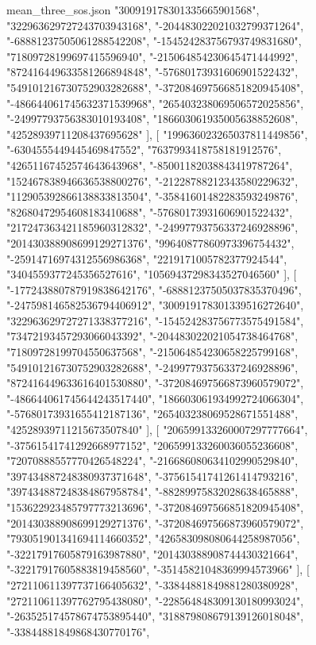 \begin{filecontents*}[overwrite]{mean_three_sos.json}
    "300919178301335665901568",
    "322963629727243703943168",
    "-204483022021032799371264",
    "-68881237505061288542208",
    "-154524283756793749831680",
    "71809728199697415596940",
    "-215064854230645471444992",
    "872416449633581266894848",
    "-57680173931606901522432",
    "549101216730752903282688",
    "-372084697566851820945408",
    "-486644061745632371539968",
    "265403238069506572025856",
    "-24997793756383010193408",
    "186603061935005638852608",
    "42528939711208437695628"
   ],
   [
    "199636023265037811449856",
    "-6304555449445469847552",
    "7637993418758181912576",
    "42651167452574643643968",
    "-85001182038843419787264",
    "152467838946636538800276",
    "-21228788212343580229632",
    "112905392866138833813504",
    "-35841601482283593249876",
    "82680472954608183410688",
    "-57680173931606901522432",
    "217247363421185960312832",
    "-24997793756337246928896",
    "201430388908699129271376",
    "99640877860973396754432",
    "-25914716974312556986368",
    "2219171005782377924544",
    "3404559377245356527616",
    "10569437298343527046560"
   ],
   [
    "-177243880787919838642176",
    "-68881237505037835370496",
    "-247598146582536794406912",
    "300919178301339516272640",
    "322963629727271338377216",
    "-154524283756773575491584",
    "73472193457293066043392",
    "-204483022021054738464768",
    "71809728199704550637568",
    "-215064854230658225799168",
    "549101216730752903282688",
    "-24997793756337246928896",
    "872416449633616401530880",
    "-372084697566873960579072",
    "-486644061745644243517440",
    "186603061934992724066304",
    "-57680173931655412187136",
    "265403238069528671551488",
    "42528939711215673507840"
   ],
   [
    "206599133260007297777664",
    "-37561541741292668977152",
    "206599133260036055236608",
    "72070888557770426548224",
    "-216686080634102990529840",
    "397434887248380937371648",
    "-37561541741261414793216",
    "397434887248384867958784",
    "-88289975832028638465888",
    "153622923485797773213696",
    "-372084697566851820945408",
    "201430388908699129271376",
    "-372084697566873960579072",
    "793051901341694114660352",
    "426583098080644258987056",
    "-32217917605879163987880",
    "201430388908744430321664",
    "-32217917605883819458560",
    "-35145821048369994573966"
   ],
   [
    "272110611397737166405632",
    "-33844881849881280380928",
    "272110611397762795438080",
    "-228564848309130180993024",
    "-263525174578674753895440",
    "318879808679139126018048",
    "-33844881849868430770176",

\end{filecontents*}
